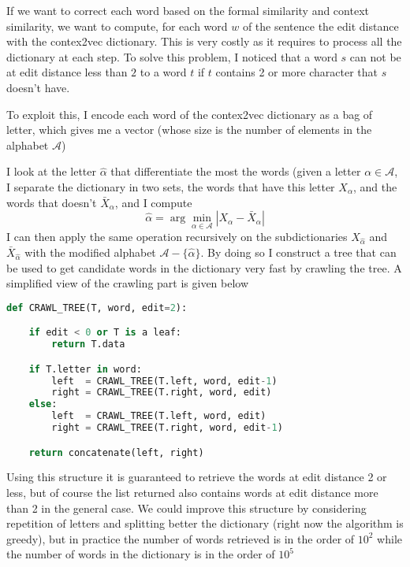 \documentclass[a4paper, 11pt]{article}
\begin{document}
If we want to correct each word based on the formal similarity and
context similarity, we want to compute, for each word $w$ of the
sentence the edit distance with the contex2vec dictionary. This is
very costly as it requires to process all the dictionary at each step.
To solve this problem, I noticed that a word $s$ can not be at edit
distance less than $2$ to a word $t$ if $t$ contains 2 or more character
that $s$ doesn't have.

To exploit this, I encode each word of the contex2vec dictionary
as a bag of letter, which gives me a vector (whose size is the number
of elements in the alphabet $\mathcal{A}$)

I look at the letter $\hat{\alpha}$ that differentiate the most the
words (given a letter $\alpha \in \mathcal{A}$, I separate the
dictionary in two sets, the words that have this letter $X_\alpha$,
and the words that doesn't $\bar{X}_\alpha$, and I compute
\begin{displaymath}
  \hat{\alpha} = \arg\min_{\alpha \in \mathcal{A}} | {X_\alpha - \bar{X}_\alpha} |
\end{displaymath}
I can then apply the same operation recursively on the subdictionaries
$X_{\hat{\alpha}}$ and $\bar{X}_{\hat{\alpha}}$ with the modified alphabet
$\mathcal{A} - \{\hat{\alpha}\}$.  By doing so I construct a tree that
can be used to get candidate words in the dictionary very fast by
crawling the tree. A simplified view of the crawling part is given below

\begin{lstlisting}[language=Python]
def CRAWL_TREE(T, word, edit=2):

    if edit < 0 or T is a leaf:
        return T.data

    if T.letter in word:
        left  = CRAWL_TREE(T.left, word, edit-1)
        right = CRAWL_TREE(T.right, word, edit)
    else:
        left  = CRAWL_TREE(T.left, word, edit)
        right = CRAWL_TREE(T.right, word, edit-1)

    return concatenate(left, right)
\end{lstlisting}

Using this structure it is guaranteed to retrieve the words at edit
distance 2 or less, but of course the list returned also contains
words at edit distance more than 2 in the general case.
We could improve this structure by considering repetition of letters
and splitting better the dictionary (right now the algorithm is greedy),
but in practice the number of words retrieved is in the order of $10^2$ while
the number of words in the dictionary is in the order of $10^5$
\end{document}

